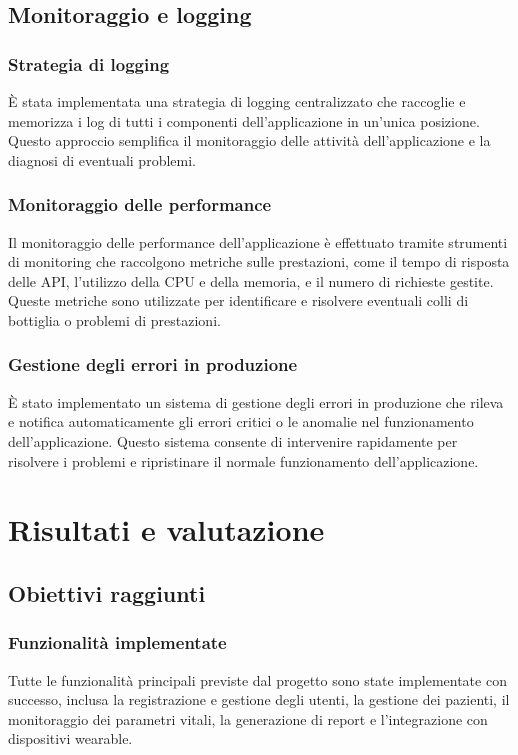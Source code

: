 \documentclass[12pt,a4paper,oneside]{report}
\begin{document}
\section{Monitoraggio e logging}
\subsection{Strategia di logging}
È stata implementata una strategia di logging centralizzato che raccoglie e memorizza i log di tutti i componenti dell'applicazione in un'unica posizione. Questo approccio semplifica il monitoraggio delle attività dell'applicazione e la diagnosi di eventuali problemi.

\subsection{Monitoraggio delle performance}
Il monitoraggio delle performance dell'applicazione è effettuato tramite strumenti di monitoring che raccolgono metriche sulle prestazioni, come il tempo di risposta delle API, l'utilizzo della CPU e della memoria, e il numero di richieste gestite. Queste metriche sono utilizzate per identificare e risolvere eventuali colli di bottiglia o problemi di prestazioni.

\subsection{Gestione degli errori in produzione}
È stato implementato un sistema di gestione degli errori in produzione che rileva e notifica automaticamente gli errori critici o le anomalie nel funzionamento dell'applicazione. Questo sistema consente di intervenire rapidamente per risolvere i problemi e ripristinare il normale funzionamento dell'applicazione.




\chapter{Risultati e valutazione}
\section{Obiettivi raggiunti}
\subsection{Funzionalità implementate}
Tutte le funzionalità principali previste dal progetto sono state implementate con successo, inclusa la registrazione e gestione degli utenti, la gestione dei pazienti, il monitoraggio dei parametri vitali, la generazione di report e l'integrazione con dispositivi wearable.
\end{document}
